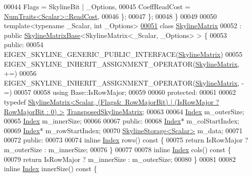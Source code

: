 \begin{DoxyCode}
00044         Flags = SkylineBit | \_Options,
00045         CoeffReadCost = \hyperlink{group___core___module_struct_eigen_1_1_num_traits}{NumTraits<Scalar>::ReadCost},
00046     \};
00047 \};
00048 \}
00049 
00050 \textcolor{keyword}{template}<\textcolor{keyword}{typename} \_Scalar, \textcolor{keywordtype}{int} \_Options>
\hyperlink{class_eigen_1_1_skyline_matrix}{00051} \textcolor{keyword}{class }\hyperlink{class_eigen_1_1_skyline_matrix}{SkylineMatrix}
00052 : \textcolor{keyword}{public} \hyperlink{class_eigen_1_1_skyline_matrix_base}{SkylineMatrixBase}<SkylineMatrix<\_Scalar, \_Options> > \{
00053 \textcolor{keyword}{public}:
00054     EIGEN\_SKYLINE\_GENERIC\_PUBLIC\_INTERFACE(\hyperlink{class_eigen_1_1_skyline_matrix}{SkylineMatrix})
00055     EIGEN\_SKYLINE\_INHERIT\_ASSIGNMENT\_OPERATOR(\hyperlink{class_eigen_1_1_skyline_matrix}{SkylineMatrix}, +=)
00056     EIGEN\_SKYLINE\_INHERIT\_ASSIGNMENT\_OPERATOR(\hyperlink{class_eigen_1_1_skyline_matrix}{SkylineMatrix}, -=)
00057 
00058     \textcolor{keyword}{using} Base::IsRowMajor;
00059 
00060 \textcolor{keyword}{protected}:
00061 
00062     \textcolor{keyword}{typedef} 
      \hyperlink{class_eigen_1_1_skyline_matrix}{SkylineMatrix<Scalar, (Flags&~RowMajorBit) | (IsRowMajor ? RowMajorBit : 0) >}
       \hyperlink{class_eigen_1_1_skyline_matrix}{TransposedSkylineMatrix};
00063 
00064     \hyperlink{group___core___module_a554f30542cc2316add4b1ea0a492ff02}{Index} m\_outerSize;
00065     \hyperlink{group___core___module_a554f30542cc2316add4b1ea0a492ff02}{Index} m\_innerSize;
00066 
00067 \textcolor{keyword}{public}:
00068     \hyperlink{group___core___module_a554f30542cc2316add4b1ea0a492ff02}{Index}* m\_colStartIndex;
00069     \hyperlink{group___core___module_a554f30542cc2316add4b1ea0a492ff02}{Index}* m\_rowStartIndex;
00070     \hyperlink{class_eigen_1_1_skyline_storage}{SkylineStorage<Scalar>} m\_data;
00071 
00072 \textcolor{keyword}{public}:
00073 
00074     \textcolor{keyword}{inline} \hyperlink{group___core___module_a554f30542cc2316add4b1ea0a492ff02}{Index} rows()\textcolor{keyword}{ const }\{
00075         \textcolor{keywordflow}{return} IsRowMajor ? m\_outerSize : m\_innerSize;
00076     \}
00077 
00078     \textcolor{keyword}{inline} \hyperlink{group___core___module_a554f30542cc2316add4b1ea0a492ff02}{Index} cols()\textcolor{keyword}{ const }\{
00079         \textcolor{keywordflow}{return} IsRowMajor ? m\_innerSize : m\_outerSize;
00080     \}
00081 
00082     \textcolor{keyword}{inline} \hyperlink{group___core___module_a554f30542cc2316add4b1ea0a492ff02}{Index} innerSize()\textcolor{keyword}{ const }\{

\end{DoxyCode}
